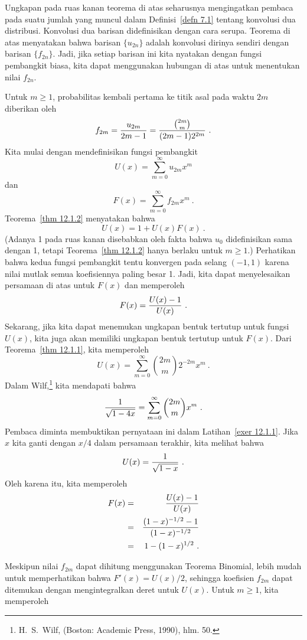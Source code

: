 Ungkapan pada ruas kanan teorema di atas seharusnya mengingatkan pembaca pada suatu jumlah
yang muncul dalam Definisi~\ref{defn 7.1} tentang konvolusi dua distribusi.  Konvolusi
dua barisan didefinisikan dengan cara serupa.  Teorema di atas menyatakan bahwa
barisan $\{u_{2n}\}$ adalah konvolusi dirinya sendiri dengan barisan
$\{f_{2n}\}$.  Jadi, jika setiap barisan ini kita nyatakan dengan fungsi pembangkit
biasa, kita dapat menggunakan hubungan di atas untuk menentukan nilai $f_{2n}$.
\begin{theorem}\label{thm 12.1.3}
Untuk $m \ge 1$, probabilitas kembali pertama ke titik asal pada waktu $2m$ diberikan oleh
$$f_{2m} = {{u_{2m}}\over{2m-1}} = {{2m \choose m}\over{(2m-1)2^{2m}}}\ .$$
\proof
Kita mulai dengan mendefinisikan fungsi pembangkit
$$U(x) = \sum_{m = 0}^\infty u_{2m}x^m$$
dan
$$F(x) = \sum_{m = 0}^\infty f_{2m}x^m\ .$$
Teorema~\ref{thm 12.1.2} menyatakan bahwa
\begin{equation} 
U(x) = 1 + U(x)F(x)\ .
\label{eq 12.1.1}  
\end{equation} 
(Adanya 1 pada ruas kanan disebabkan oleh fakta bahwa $u_0$ didefinisikan sama dengan 1,
tetapi Teorema~\ref{thm 12.1.2} hanya berlaku untuk $m \ge 1$.)  Perhatikan bahwa kedua fungsi pembangkit
tentu konvergen pada selang $(-1, 1)$ karena nilai mutlak semua koefisiennya paling besar 1.
Jadi, kita dapat menyelesaikan persamaan di atas untuk $F(x)$ dan memperoleh
$$F(x) = {{U(x) - 1}\over{U(x)}}\ .$$
Sekarang, jika kita dapat menemukan ungkapan bentuk tertutup untuk fungsi $U(x)$, kita juga akan memiliki
ungkapan bentuk tertutup untuk $F(x)$.  Dari Teorema~\ref{thm 12.1.1}, kita memperoleh
$$U(x) = \sum_{m = 0}^\infty {2m \choose m}2^{-2m}x^m\ .$$
Dalam Wilf,\footnote{H.~S.~Wilf, 
(Boston: Academic Press, 1990), hlm. 50.} kita mendapati bahwa
$${1\over{\sqrt {1 - 4x}}} = \sum_{m = 0}^\infty {2m \choose m} x^m\ .$$
Pembaca diminta membuktikan pernyataan ini dalam Latihan~\ref{exer 12.1.1}.  Jika $x$ kita ganti dengan $x/4$
dalam persamaan terakhir, kita melihat bahwa
$$U(x) = {1\over{\sqrt {1-x}}}\ .$$
Oleh karena itu, kita memperoleh
\begin{eqnarray*}
F(x) &=& {{U(x) - 1}\over{U(x)}}\\
     &=& {{(1-x)^{-1/2} - 1}\over{(1-x)^{-1/2}}}\\
     &=& 1 - (1-x)^{1/2}\ . 
\end{eqnarray*}

Meskipun nilai $f_{2m}$ dapat dihitung menggunakan Teorema Binomial, lebih
mudah untuk memperhatikan bahwa $F'(x) = U(x)/2$, sehingga koefisien $f_{2m}$ dapat ditemukan dengan
mengintegralkan deret untuk $U(x)$.  Untuk $m \ge 1$, kita memperoleh


\end{theorem}
